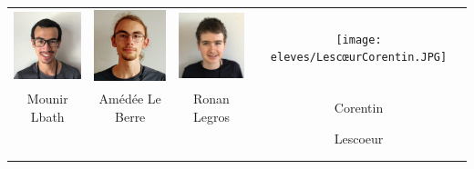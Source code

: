 \vfill
\pagebreak

\begin{center}
\begin{tabular}{cccc}
\includegraphics[angle=270,origin=c, width=27mm]{eleves/Lbath Mounir.JPG} &
\includegraphics[angle=0,origin=c, width=27mm]{eleves/Le Berre Amédée.JPG} &
\includegraphics[angle=270,origin=c, width=27mm]{eleves/Legros Ronan.JPG} &
\texttt{[image: eleves/LescœurCorentin.JPG]} \\
Mounir Lbath & Amédée Le Berre & Ronan Legros & Corentin \\ & & & Lescoeur \\ \\ \\


\end{tabular}
\end{center}
